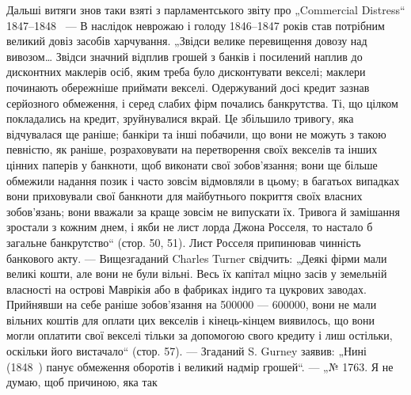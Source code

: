 Дальші витяги знов таки взяті з парламентського звіту про
„Commercial Distress“ 1847--1848~ — В наслідок неврожаю і голоду 1846--1847 років став потрібним
великий довіз засобів харчування. „Звідси велике перевищення довозу над вивозом\dots{} Звідси
значний відплив грошей з банків і посилений наплив до дисконтних маклерів осіб, яким треба було
дисконтувати векселі;
маклери починають обережніше приймати векселі. Одержуваний
досі кредит зазнав серйозного обмеження, і серед слабих фірм
почались банкрутства. Ті, що цілком покладались на кредит,
зруйнувалися вкрай. Це збільшило тривогу, яка відчувалася ще
раніше; банкіри та інші побачили, що вони не можуть з такою
певністю, як раніше, розраховувати на перетворення своїх векселів та інших цінних паперів у
банкноти, щоб виконати свої зобов’язання; вони ще більше обмежили надання позик і часто
зовсім відмовляли в цьому; в багатьох випадках вони приховували свої банкноти для майбутнього
покриття своїх власних зобов’язань; вони вважали за краще зовсім не випускати їх. Тривога
й замішання зростали з кожним днем, і якби не лист лорда
Джона Росселя, то настало б загальне банкрутство“ (стор. 50, 51).
Лист Росселя припинював чинність банкового акту. — Вищезгаданий Charles Turner свідчить: „Деякі
фірми мали великі кошти, але
вони не були вільні. Весь їх капітал міцно засів у земельній
власності на острові Маврікія або в фабриках індиго та цукрових заводах. Прийнявши на себе раніше
зобов’язання на \num{500000} — \num{600000}, вони не мали вільних коштів для
оплати цих векселів і кінець-кінцем виявилось, що вони могли
оплатити свої векселі тільки за допомогою свого кредиту і лиш
остільки, оскільки його вистачало“ (стор. 57). — Згаданий S. Gurney
заявив: „Нині (1848~) панує обмеження оборотів і великий
надмір грошей“. — „№ 1763. Я не думаю, щоб причиною, яка так
\parbreak{}  %
